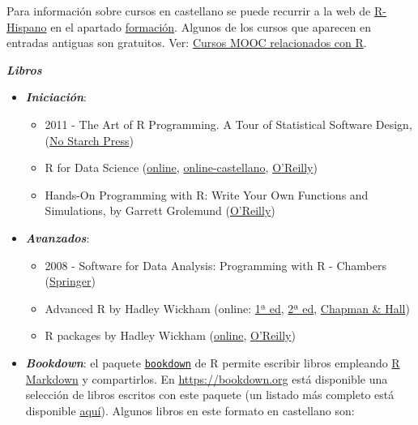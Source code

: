 \documentclass[
]{book}
\theoremstyle{break}
\theoremstyle{definition}
\theoremstyle{definition}
\theoremstyle{definition}
\theoremstyle{remark}
\begin{document}
Para información sobre cursos en castellano se puede recurrir a la web de \href{http://r-es.org/}{R-Hispano} en el apartado \href{http://r-es.org/category/formacion}{formación}. Algunos de los cursos que aparecen en entradas antiguas son gratuitos.
Ver: \href{http://r-es.org/2016/02/12/cursos-masivos-y-otra-formacion-on-line-sobre-r/}{Cursos MOOC relacionados con R}.

\textbf{\emph{Libros}}

\begin{itemize}
\item
  \textbf{\emph{Iniciación}}:

  \begin{itemize}
  \item
    2011 - The Art of R Programming. A Tour of Statistical Software Design,
    (\href{https://www.nostarch.com/artofr.htm}{No Starch Press})
  \item
    R for Data Science
    (\href{http://r4ds.had.co.nz}{online}, \href{https://es.r4ds.hadley.nz}{online-castellano},
    \href{http://shop.oreilly.com/product/0636920034407.do}{O'Reilly})
  \item
    Hands-On Programming with R: Write Your Own Functions and Simulations,
    by Garrett Grolemund
    (\href{http://shop.oreilly.com/product/0636920028574.do}{O'Reilly})
  \end{itemize}
\item
  \textbf{\emph{Avanzados}}:

  \begin{itemize}
  \item
    2008 - Software for Data Analysis: Programming with R - Chambers
    (\href{http://www.springer.com/la/book/9780387759357}{Springer})
  \item
    Advanced R by Hadley Wickham
    (online: \href{http://adv-r.had.co.nz/}{1ª ed},
    \href{https://adv-r.hadley.nz/}{2ª ed},
    \href{https://www.amazon.com/dp/1466586966}{Chapman \& Hall})
  \item
    R packages by Hadley Wickham
    (\href{http://r-pkgs.had.co.nz/}{online},
    \href{http://shop.oreilly.com/product/0636920034421.do}{O'Reilly})
  \end{itemize}
\item
  \textbf{\emph{Bookdown}}:
  el paquete \href{https://bookdown.org}{\texttt{bookdown}} de R permite escribir libros empleando
  \href{http://rmarkdown.rstudio.com}{R Markdown} y compartirlos.
  En \url{https://bookdown.org} está disponible una selección de libros escritos con este paquete
  (un listado más completo está disponible \href{https://bookdown.org/home/archive/}{aquí}).
  Algunos libros en este formato en castellano son:


\end{itemize}
\end{document}
